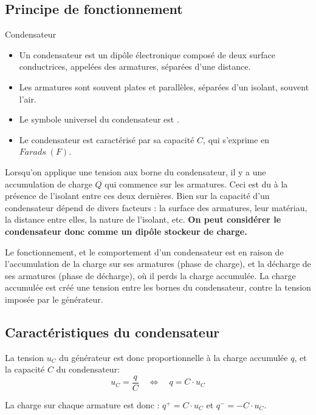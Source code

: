 \documentclass[11pt,a4paper]{article}
\begin{document}
\subsection{Principe de fonctionnement}

\begin{defn}{Condensateur}
\begin{itemize}
    \item Un condensateur est un dipôle électronique composé de deux surface conductrices, appelées des armatures, séparées d'une distance. 
    \item Les armatures sont souvent plates et parallèles, séparées d'un isolant, souvent l'air. 
    \item Le symbole universel du condensateur est . 
    \item Le condensateur est caractérisé par sa capacité $C$, qui s'exprime en $Farads\; (F)$. 
\end{itemize}
\end{defn}

Lorsqu'on applique une tension aux borne du condensateur, il y a une accumulation de charge $Q$ qui commence sur les armatures. Ceci est du à la présence de l'isolant entre ces deux dernières. Bien sur la capacité d'un condensateur dépend de divers facteurs : la surface des armatures, leur matériau, la distance entre elles, la nature de l'isolant, etc. \textbf{On peut considérer le condensateur donc comme un dipôle stockeur de charge. }

Le fonctionnement, et le comportement d'un condensateur est en raison de l'accumulation de la charge sur ses armatures (phase de charge), et la décharge de ses armatures (phase de décharge), où il perds la charge accumulée. La charge accumulée est créé une tension entre les bornes du condensateur, contre la tension imposée par le générateur. 

\subsection{Caractéristiques du condensateur}

La tension $u_C$ du générateur est donc proportionnelle à la charge accumulée $q$, et la capacité $C$ du condensateur: 
\begin{equation}
    u_C = \dfrac{q}{C} \quad \Longleftrightarrow \quad q=C\cdot u_C
\end{equation} 
 
La charge sur chaque armature est donc : $q^+ = C\cdot u_C$ et $q^- = -C\cdot u_C$. 
\end{document}
